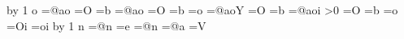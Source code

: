 {      \fi
     \fi
    \fi%
   \fi%
   \advance\syllablecount by 1
  \else \if\thischar o%
   \iffollowingisboundary%
    \ifpreviousisboundary%
     \t@kenbuffer=\expandafter{\the\t@kenbuffer @ao}%
    \else%
     \ifpreviousisround
      \t@kenbuffer=\expandafter{\the\t@kenbuffer O}%
     \else
      \t@kenbuffer=\expandafter{\the\t@kenbuffer b}%
     \fi
    \fi%
   \else%
    \ifpreviousisboundary%
     \t@kenbuffer=\expandafter{\the\t@kenbuffer @ao}%
    \else%
     \ifpreviousisround
      \t@kenbuffer=\expandafter{\the\t@kenbuffer O}%
     \else
      \iffollowingispseudoboundary
       \t@kenbuffer=\expandafter{\the\t@kenbuffer b}%
      \else
       \t@kenbuffer=\expandafter{\the\t@kenbuffer o}%
      \fi
     \fi
    \fi
   \fi
  \else \if\thischar\o@mlaut%
   \iffollowingisboundary%
    \ifpreviousisboundary%
     \t@kenbuffer=\expandafter{\the\t@kenbuffer @aoY}%
    \else%
     \ifpreviousisround
      \t@kenbuffer=\expandafter{\the\t@kenbuffer O}%
     \else
      \t@kenbuffer=\expandafter{\the\t@kenbuffer b}%
     \fi
    \fi%
   \else%
    \ifpreviousisboundary%
     \t@kenbuffer=\expandafter{\the\t@kenbuffer @aoi}%
    \else%
     \ifnum\syllablecount>0
      \ifpreviousisround
       \t@kenbuffer=\expandafter{\the\t@kenbuffer O}%
      \else
       \iffollowingispseudoboundary
        \t@kenbuffer=\expandafter{\the\t@kenbuffer b}%
       \else
        \t@kenbuffer=\expandafter{\the\t@kenbuffer o}%
       \fi
      \fi
     \else
      \ifpreviousisround
       \t@kenbuffer=\expandafter{\the\t@kenbuffer Oi}%
      \else
       \t@kenbuffer=\expandafter{\the\t@kenbuffer oi}%
      \fi
     \fi
    \fi
   \fi
  \advance\syllablecount by 1
  \else \if\thischar n%
   \iffollowingisboundary%
    \ifpreviousisboundary%
     \t@kenbuffer=\expandafter{\the\t@kenbuffer @n}%
    \else%
     \t@kenbuffer=\expandafter{\the\t@kenbuffer e}%
    \fi%
   \else%
    \ifpreviousisboundary%
     \ifcase\thisfvs
      \t@kenbuffer=\expandafter{\the\t@kenbuffer @n}%
     \or
      \t@kenbuffer=\expandafter{\the\t@kenbuffer @a}%
     \fi
    \else%
     \iffollowingisvowel
      \ifcase\thisfvs
       \ifpreviousisround
	\t@kenbuffer=\expandafter{\the\t@kenbuffer V}%
}

